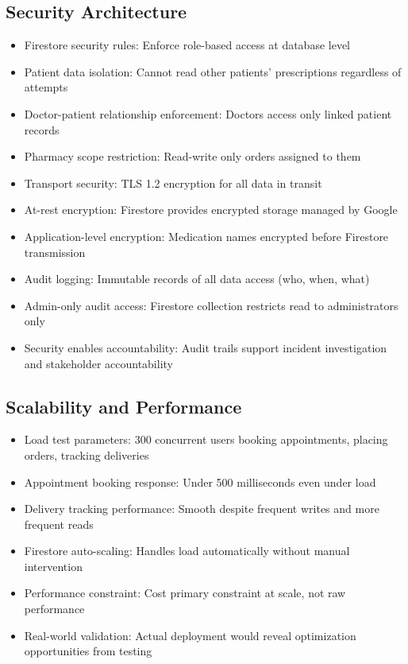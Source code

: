 \documentclass[12pt,a4paper]{report}
\begin{document}
\subsection{Security Architecture}

\begin{itemize}
  \item Firestore security rules: Enforce role-based access at database level
  \item Patient data isolation: Cannot read other patients' prescriptions regardless of attempts
  \item Doctor-patient relationship enforcement: Doctors access only linked patient records
  \item Pharmacy scope restriction: Read-write only orders assigned to them
  \item Transport security: TLS 1.2 encryption for all data in transit
  \item At-rest encryption: Firestore provides encrypted storage managed by Google
  \item Application-level encryption: Medication names encrypted before Firestore transmission
  \item Audit logging: Immutable records of all data access (who, when, what)
  \item Admin-only audit access: Firestore collection restricts read to administrators only
  \item Security enables accountability: Audit trails support incident investigation and stakeholder accountability
\end{itemize}

\subsection{Scalability and Performance}

\begin{itemize}
  \item Load test parameters: 300 concurrent users booking appointments, placing orders, tracking deliveries
  \item Appointment booking response: Under 500 milliseconds even under load
  \item Delivery tracking performance: Smooth despite frequent writes and more frequent reads
  \item Firestore auto-scaling: Handles load automatically without manual intervention
  \item Performance constraint: Cost primary constraint at scale, not raw performance
  \item Real-world validation: Actual deployment would reveal optimization opportunities from testing
\end{itemize}
\end{document}
